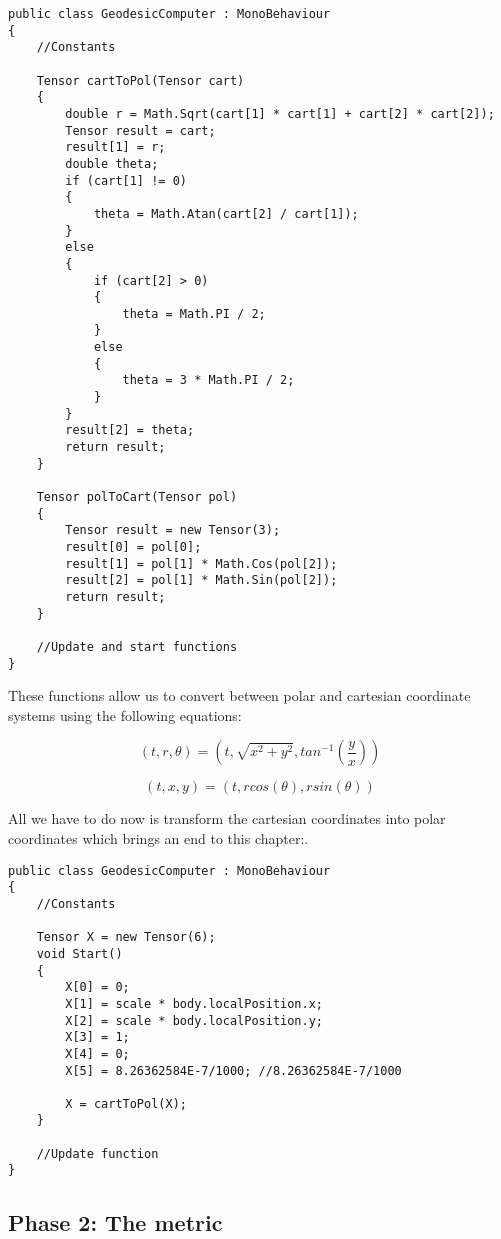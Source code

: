 \documentclass{article}
\begin{document}
\begin{verbatim}
public class GeodesicComputer : MonoBehaviour
{
    //Constants

    Tensor cartToPol(Tensor cart)
    {
        double r = Math.Sqrt(cart[1] * cart[1] + cart[2] * cart[2]);
        Tensor result = cart;
        result[1] = r;
        double theta;
        if (cart[1] != 0)
        { 
            theta = Math.Atan(cart[2] / cart[1]);
        }
        else
        {
            if (cart[2] > 0)
            {
                theta = Math.PI / 2;
            }
            else
            {
                theta = 3 * Math.PI / 2;
            }
        }
        result[2] = theta;
        return result;
    }

    Tensor polToCart(Tensor pol)
    {
        Tensor result = new Tensor(3);
        result[0] = pol[0];
        result[1] = pol[1] * Math.Cos(pol[2]);
        result[2] = pol[1] * Math.Sin(pol[2]);
        return result;
    }

    //Update and start functions
}
\end{verbatim}

These functions allow us to convert between polar and cartesian coordinate systems using the following equations:

\begin{equation*}
(t,r,\theta) = (t,\sqrt{x^2+y^2},tan^{-1}(\frac{y}{x}))
\end{equation*}

\begin{equation*}
(t,x,y) = (t,rcos(\theta),rsin(\theta))
\end{equation*}

\newpage
All we have to do now is transform the cartesian coordinates into polar coordinates which brings an end to this chapter:.
\begin{verbatim}
public class GeodesicComputer : MonoBehaviour
{
    //Constants

    Tensor X = new Tensor(6);
    void Start()
    {
        X[0] = 0;
        X[1] = scale * body.localPosition.x;
        X[2] = scale * body.localPosition.y;
        X[3] = 1;
        X[4] = 0;
        X[5] = 8.26362584E-7/1000; //8.26362584E-7/1000

        X = cartToPol(X);
    }

    //Update function
}
\end{verbatim}

\subsection{Phase 2: The metric}
\end{document}
